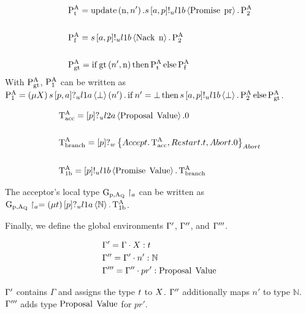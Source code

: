 \begin{align*}
&\operatorname{P^{A}_{t}} = \operatorname{update} \left(\operatorname{n}, n'\right).s\left[a, p\right]!_u l1b \left\langle \operatorname{Promise}\; \operatorname{pr} \right\rangle.\operatorname{P^{A}_{2}}
\\\\
&\operatorname{P^{A}_{f}} = s\left[a, p\right]!_u l1b \left\langle \operatorname{Nack}\; \operatorname{n} \right\rangle.\operatorname{P^{A}_{2}}
\\\\
&\operatorname{P^{A}_{gt}} = \operatorname{if} \operatorname{gt}\left(n', \operatorname{n}\right)\operatorname{then} \operatorname{P^{A}_{t}}\operatorname{else} \operatorname{P^{A}_{f}}
\end{align*}
With $\operatorname{P^{A}_{gt}}$, $\operatorname{P^{A}_{1}}$ can be written as $\operatorname{P^{A}_{1}} = \left(\mu X\right)s\left[p, a\right]?_u l1a \left\langle \bot \right\rangle \left(n'\right).\operatorname{if} n'=\bot\operatorname{then} s\left[a, p\right]!_u l1b \left\langle \bot \right\rangle.\operatorname{P^{A}_{2}}\operatorname{else} \operatorname{P^{A}_{gt}}$.

\begin{align*}    
&\operatorname{T^{A}_{acc}} = \left[p\right]?_u l2a \left\langle \operatorname{Proposal}\; \operatorname{Value} \right\rangle.0
\\\\
&\operatorname{T^{A}_{branch}} = \left[p\right]?_w \left\{\mathnormal{Accept} . \operatorname{T^{A}_{acc}} , \mathnormal{Restart} . t , \mathnormal{Abort} .0\right\}_{\mathnormal{Abort}}
\\\\
&\operatorname{T^{A}_{1b}} = \left[p\right]!_u l1b \left\langle \operatorname{Promise}\; \operatorname{Value} \right\rangle . \operatorname{T^{A}_{branch}}
\end{align*}

The acceptor's local type $\operatorname{G_{p, A_Q}} \upharpoonright_{a}$ can be written as $\operatorname{G_{p, A_Q}} \upharpoonright_{a} = \left(\mu t\right)\left[p\right]?_u l1a \left\langle \mathbb{N} \right\rangle.\operatorname{T^{A}_{1b}}$.

Finally, we define the global environments $\Gamma'$, $\Gamma''$, and $\Gamma'''$.

\begin{align*}
&\Gamma' = \Gamma \cdot X:t\\
&\Gamma'' = \Gamma' \cdot n':\mathbb{N}\\
&\Gamma''' = \Gamma'' \cdot pr':\operatorname{Proposal}\; \operatorname{Value}
\end{align*}

$\Gamma'$ contains $\Gamma$ and assigns the type $t$ to $X$.
$\Gamma''$ additionally maps $n'$ to type $\mathbb{N}$.
$\Gamma'''$ adds type $\operatorname{Proposal}\; \operatorname{Value}$ for $pr'$.


